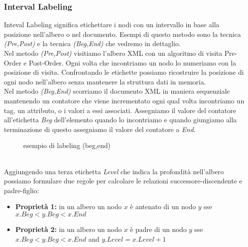 \documentclass[12pt,a4paper,openright,twoside]{report}
\theoremstyle{definition}
\begin{document}
\subsubsection{Interval Labeling}
Inteval Labeling significa etichettare i nodi con un intervallo in base alla posizione nell'albero o nel documento. Esempi di questo metodo sono la tecnica \emph{(Pre,Post)} e la tecnica \emph{(Beg,End)} che vedremo in dettaglio.
\\
Nel metodo \emph{(Pre,Post)} visitiamo l'albero XML con un algoritmo di visita Pre-Order e Post-Order. Ogni volta che incontriamo un nodo lo numeriamo con la posizione di visita. Confrontando le etichette possiamo ricostruire la posizione di ogni nodo nell'albero senza mantenere la struttura dati in memoria.
\\
Nel metodo \emph{(Beg,End)} scorriamo il documento XML in maniera sequenziale mantenendo un contatore che viene incrementato ogni qual volta incontriamo un tag, un attributo, o i valori a essi associati. Assegniamo il valore del contatore all'etichetta \emph{Beg} dell'elemento quando lo incontriamo e quando giungiamo alla terminazione di questo assegniamo il valore del contatore a \emph{End}.
\begin{figure}[t]
\begin{tikzpicture}
\end{tikzpicture}
\caption{esempio di labeling (beg,end)}
\end{figure}
\\
Aggiungendo una terza etichetta \emph{Level} che indica la profondità nell'albero possiamo formulare due regole per calcolare le relazioni successore-discendente e padre-figlio:
\begin{itemize}
\item \textbf{Proprietà 1:} in un albero un nodo $x$ è antenato di un nodo $y$ sse $x.Beg < y.Beg < x.End$
\item \textbf{Proprietà 2:} in un albero un nodo $x$ è padre di un nodo $y$ sse $x.Beg < y.Beg < x.End$ and $y.Level = x.Level + 1$
\end{itemize}
\end{document}
